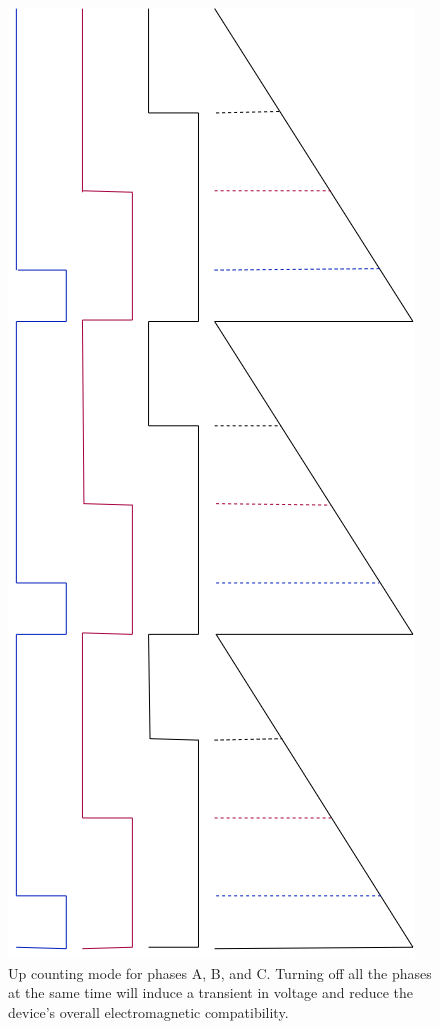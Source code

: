 \documentclass{article}
\begin{document}
			\begin{figure}[!h]
				\begin{center}
					\includegraphics[scale=0.4, angle=90]{UpCountingMode}
				\end{center}
				\caption{Up counting mode for phases A, B, and C.  Turning off all the phases at the same time will induce a transient in voltage and reduce the device's overall electromagnetic compatibility.}
				\label{fig:UpCountingMode}
			\end{figure}
			
\end{document}

